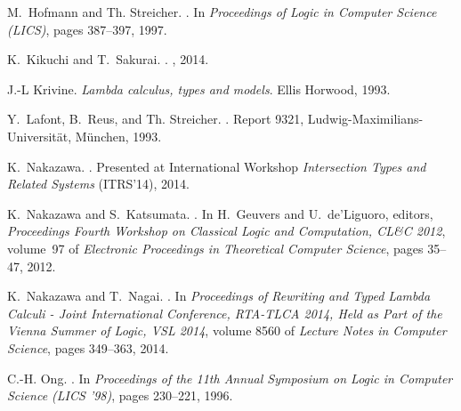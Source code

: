 \documentclass{CSML}
\begin{document}
\begin{thebibliography}{10}
M.~Hofmann and Th. Streicher.
.
\newblock In \emph{Proceedings of Logic in Computer Science (LICS)}, pages
 387--397, 1997.

K.~Kikuchi and T.~Sakurai.
.
, 2014.

J.-L Krivine.
\newblock \emph{{Lambda calculus, types and models}}.
\newblock Ellis Horwood, 1993.

Y.~Lafont, B.~Reus, and Th. Streicher.
.
\newblock Report 9321, Ludwig-Maximilians-Universit\"at, M\"unchen, 1993.


K.~Nakazawa.
.
\newblock Presented at International Workshop \emph{Intersection Types and
 Related Systems} (ITRS'14), 2014.

K.~Nakazawa and S.~Katsumata.
.
\newblock In H.~Geuvers and U.~de'Liguoro, editors, \emph{Proceedings Fourth
 Workshop on Classical Logic and Computation, CL{\&}C 2012}, volume~97 of {\em
 Electronic Proceedings in Theoretical Computer Science}, pages 35--47, 2012.

K.~Nakazawa and T.~Nagai.
.
\newblock In \emph{Proceedings of Rewriting and Typed Lambda Calculi - Joint
 International Conference, {RTA-TLCA} 2014, Held as Part of the Vienna Summer
 of Logic, {VSL} 2014}, volume 8560 of \emph{Lecture Notes in Computer
 Science}, pages 349--363, 2014.

C.-H. Ong.
.
\newblock In \emph{Proceedings of the 11th Annual Symposium on Logic in Computer
 Science (LICS '98)}, pages 230--221, 1996.


\end{thebibliography}
\end{document}

